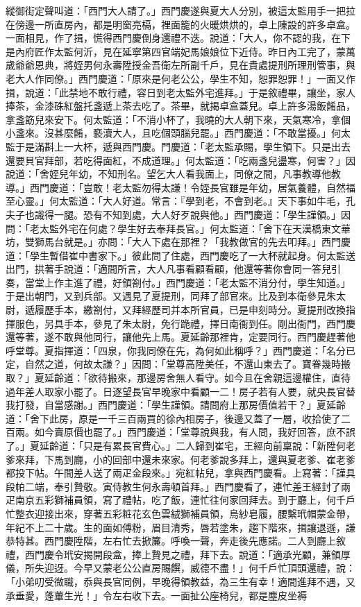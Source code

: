 \begin{showcontents}{}
縱御街定聲叫道：「西門大人請了。」西門慶遂與夏大人分別，被這太監用手一把拉在傍邊一所直房內，都是明窗亮槅，裡面籠的火暖烘烘的，卓上陳設的許多卓盒。一面相見，作了揖，慌得西門慶倒身還禮不迭。說道：「大人，你不認的我，在下是內府匠作太監何沂，見在延寧第四官端妃馬娘娘位下近侍。昨日內工完了，蒙萬歲爺爺恩典，將姪男何永壽陞授金吾衛左所副千戶，見在貴處提刑所理刑管事，與老大人作同僚。」西門慶道：「原來是何老公公，學生不知，恕罪恕罪！」一面又作揖，說道：「此禁地不敢行禮，容日到老太監外宅進拜。」于是敘禮畢，讓坐，家人捧茶，金漆硃紅盤托盞遞上茶去吃了。茶畢，就揭卓盒蓋兒。卓上許多湯飯餚品，拿盞筯兒來安下。何太監道：「不消小杯了，我曉的大人朝下來，天氣寒冷，拿個小盞來。沒甚麼餚，褻瀆大人，且吃個頭腦兒罷。」西門慶道：「不敢當擾。」何太監于是滿斟上一大杯，遞與西門慶。門慶道：「老太監承賜，學生領下。只是出去還要貝官拜部，若吃得面紅，不成道理。」何太監道：「吃兩盞兒盪寒，何害？」因說道：「舍姪兒年幼，不知刑名。望乞大人看我面上，同僚之間，凡事教導他教導。」西門慶道：「豈敢！老太監勿得太謙！令姪長官雖是年幼，居氣養體，自然福至心靈。」何太監道：「大人好道。常言：『學到老，不會到老。』天下事如牛毛，孔夫子也識得一腿。恐有不知到處，大人好歹說與他。」西門慶道：「學生謹領。」因問：「老太監外宅在何處？學生好去奉拜長官。」何太監道：「舍下在天漢橋東文華坊，雙獅馬台就是。」亦問：「大人下處在那裡？「我教做官的先去叩拜。」西門慶道：「學生暫借崔中書家下。」彼此問了住處，西門慶吃了一大杯就起身。何太監送出門，拱著手說道：「適間所言，大人凡事看顧看顧，他還等著你會同一答兒引奏，當堂上作主進了禮，好領劄付。」西門慶道：「老太監不消分付，學生知道。」于是出朝門，又到兵部。又遇見了夏提刑，同拜了部官來。比及到本衛參見朱太尉，遞履歷手本，繳劄付，又拜經歷司并本所官員，已是申刻時分。夏提刑改換指揮服色，另具手本，參見了朱太尉，免行跪禮，擇日南衙到任。剛出衙門，西門慶還等著，遂不敢與他同行，讓他先上馬。夏延齡那裡肯，定要同行。西門慶趕著他呼堂尊。夏指揮道：「四泉，你我同僚在先，為何如此稱呼？」西門慶道：「名分已定，自然之道，何故太謙？」因問：「堂尊高陞美任，不還山東去了。寶眷幾時搬取？」夏延齡道：「欲待搬來，那邊房舍無人看守。如今且在舍親這邊權住，直待過年差人取家小罷了。日逐望長官早晚家中看顧一二！房子若有人要，就央長官替我打發，自當感謝。」西門慶道：「學生謹領。請問府上那房價值若干？」夏延齡道：「舍下此房，原是一千三百兩買的徐內相房子，後邊又蓋了一層，收拾使了二百兩。如今賣原價也罷了。」西門慶道：「堂尊說與我，有人問，我好回答，庶不誤了。」夏延齡道：「只是有累長官費心。」二人歸到崔宅，王經向前稟說：「新陞何老爹來拜，下馬到廳，小的回部中還未來家。何老爹說多拜上，還與夏老爹、崔老爹都投下帖。午間差人送了兩疋金段來。」宛紅帖兒，拿與西門慶看。上寫著：「謹具段帕二端，奉引贄敬。寅侍教生何永壽頓首拜。」西門慶看了，連忙差王經封了兩疋南京五彩獅補員領，寫了禮帖，吃了飯，連忙往何家回拜去。到于廳上，何千戶忙整衣迎接出來，穿著五彩粧花玄色雲絨獅補員領，烏紗皂履，腰繫玳帽蒙金帶，年紀不上二十歲。生的面如傅粉，眉目清秀，唇若塗朱，趨下階來，揖讓退遜，謙恭特甚。西門慶陞階，左右忙去掀簾。呼喚一聲，奔走後先應諾。二人到廳上敘禮，西門慶令玳安揭開段盒，捧上贄見之禮，拜下去。說道：「適承光顧，兼領厚儀，所失迎迓。今早又蒙老公公直房賜饌，威德不盡！」何千戶忙頂頭還禮，說：「小弟叨受微職，忝與長官同例，早晚得領教益，為三生有幸！適間進拜不遇，又承垂愛，蓬蓽生光！」令左右收下去。一面扯公座椅兒，都是塵皮坐褥
\end{showcontents}
